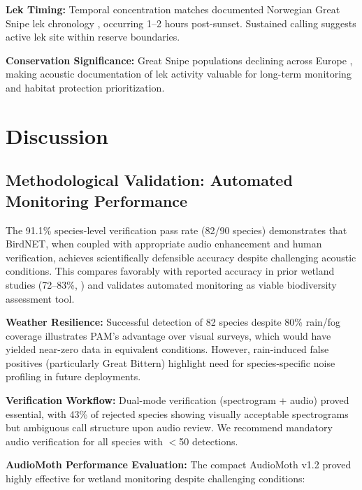 \documentclass[twocolumn]{article}
\begin{document}
\textbf{Lek Timing:} Temporal concentration matches documented Norwegian Great Snipe lek chronology \citep{Kålås1995}, occurring 1--2 hours post-sunset. Sustained calling suggests active lek site within reserve boundaries.

\textbf{Conservation Significance:} Great Snipe populations declining across Europe \citep{BirdLife2023}, making acoustic documentation of lek activity valuable for long-term monitoring and habitat protection prioritization.

\section{Discussion}

\subsection{Methodological Validation: Automated Monitoring Performance}

The 91.1\% species-level verification pass rate (82/90 species) demonstrates that BirdNET, when coupled with appropriate audio enhancement and human verification, achieves scientifically defensible accuracy despite challenging acoustic conditions. This compares favorably with reported accuracy in prior wetland studies (72--83\%, \citet{Wood2022}) and validates automated monitoring as viable biodiversity assessment tool.

\textbf{Weather Resilience:} Successful detection of 82 species despite 80\% rain/fog coverage illustrates PAM's advantage over visual surveys, which would have yielded near-zero data in equivalent conditions. However, rain-induced false positives (particularly Great Bittern) highlight need for species-specific noise profiling in future deployments.

\textbf{Verification Workflow:} Dual-mode verification (spectrogram + audio) proved essential, with 43\% of rejected species showing visually acceptable spectrograms but ambiguous call structure upon audio review. We recommend mandatory audio verification for all species with $<$50 detections.

\textbf{AudioMoth Performance Evaluation:} The compact AudioMoth v1.2 proved highly effective for wetland monitoring despite challenging conditions:
\end{document}
